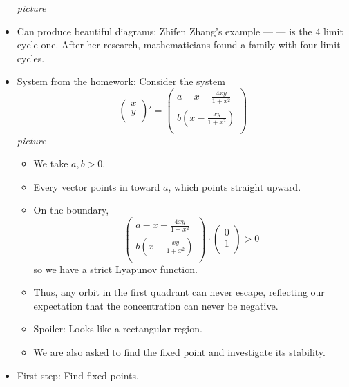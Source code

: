 \documentclass[../notes.tex]{subfiles}
\begin{document}
\begin{itemize}
    \emph{picture}
    \item Can produce beautiful diagrams: Zhifen Zhang's example --- \textcite{bib:Zhang} --- is the 4 limit cycle one. After her research, mathematicians found a family with four limit cycles.
    \item System from the homework: Consider the system
    \begin{equation*}
        \begin{pmatrix}
            x\\
            y\\
        \end{pmatrix}'
        =
        \begin{pmatrix}
            a-x-\frac{4xy}{1+x^2}\\
            b(x-\frac{xy}{1+x^2})\\
        \end{pmatrix}
    \end{equation*}
    \emph{picture}
    \begin{itemize}
        \item We take $a,b>0$.
        \item Every vector points in toward $a$, which points straight upward.
        \item On the boundary,
        \begin{equation*}
            \begin{pmatrix}
                a-x-\frac{4xy}{1+x^2}\\
                b(x-\frac{xy}{1+x^2})\\
            \end{pmatrix}
            \cdot
            \begin{pmatrix}
                0\\
                1\\
            \end{pmatrix}
            > 0
        \end{equation*}
        so we have a strict Lyapunov function.
        \item Thus, any orbit in the first quadrant can never escape, reflecting our expectation that the concentration can never be negative.
        \item Spoiler: Looks like a rectangular region.
        \item We are also asked to find the fixed point and investigate its stability.
    \end{itemize}
    \item First step: Find fixed points.

\end{itemize}
\end{document}
